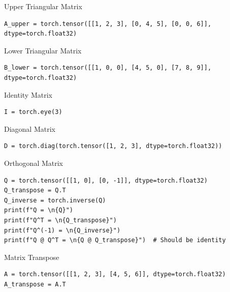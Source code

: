 \documentclass[aspectratio=169,xcolor=dvipsnames,svgnames,x11names,fleqn]{beamer}
\begin{document}
\begin{frame}[containsverbatim]{Upper Triangular Matrix}
\begin{verbatim}
A_upper = torch.tensor([[1, 2, 3], [0, 4, 5], [0, 0, 6]], dtype=torch.float32)
\end{verbatim}
\end{frame}


\begin{frame}[containsverbatim]{Lower Triangular Matrix}
\begin{verbatim}
B_lower = torch.tensor([[1, 0, 0], [4, 5, 0], [7, 8, 9]], dtype=torch.float32)
\end{verbatim}
\end{frame}

\begin{frame}[containsverbatim]{Identity Matrix}
\begin{verbatim}
I = torch.eye(3)
\end{verbatim}
\end{frame}

\begin{frame}[containsverbatim]{Diagonal Matrix}
\begin{verbatim}
D = torch.diag(torch.tensor([1, 2, 3], dtype=torch.float32))
\end{verbatim}
\end{frame}


\begin{frame}[containsverbatim]{Orthogonal Matrix}
\begin{verbatim}
Q = torch.tensor([[1, 0], [0, -1]], dtype=torch.float32)
Q_transpose = Q.T
Q_inverse = torch.inverse(Q)
print(f"Q = \n{Q}")
print(f"Q^T = \n{Q_transpose}")
print(f"Q^(-1) = \n{Q_inverse}")
print(f"Q @ Q^T = \n{Q @ Q_transpose}")  # Should be identity
\end{verbatim}
\end{frame}

\begin{frame}[containsverbatim]{Matrix Transpose}
\begin{verbatim}
A = torch.tensor([[1, 2, 3], [4, 5, 6]], dtype=torch.float32)
A_transpose = A.T
\end{verbatim}
\end{frame}
\end{document}
